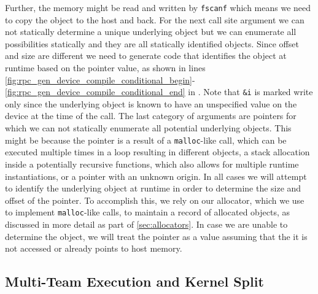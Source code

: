 Further, the memory might be read and written by \lstinline|fscanf| which means we need to copy the object to the host and back.
For the next call site argument we can not statically determine a unique underlying object but we can enumerate all possibilities statically and they are all statically identified objects.
Since offset and size are different we need to generate code that identifies the object at runtime based on the pointer value, as shown in lines \ref{fig:rpc_gen_device_compile_conditional_begin}-\ref{fig:rpc_gen_device_compile_conditional_end} in .
Note that \lstinline|&i| is marked write only since the underlying object is known to have an unspecified value on the device at the time of the call.
The last category of arguments are pointers for which we can not statically enumerate all potential underlying objects.
This might be because the pointer is a result of a \lstinline|malloc|-like call, which can be executed multiple times in a loop resulting in different objects, a stack allocation inside a potentially recursive functions, which also allows for multiple runtime instantiations, or a pointer with an unknown origin.
In all cases we will attempt to identify the underlying object at runtime in order to determine the size and offset of the pointer.
To accomplish this, we rely on our allocator, which we use to implement \lstinline|malloc|-like calls, to maintain a record of allocated objects, as discussed in more detail as part of \cref{sec:allocators}.
In case we are unable to determine the object, we will treat the pointer as a value assuming that the it is not accessed or already points to host memory.

\subsection{Multi-Team Execution and Kernel Split}

